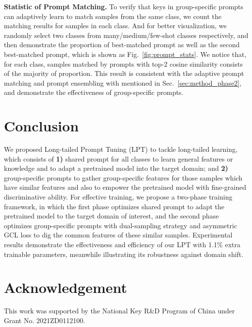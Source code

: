 \documentclass{article} \usepackage{iclr2023_conference,times}
\begin{document}
\textbf{Statistic of Prompt Matching. }
To verify that keys in group-specific prompts can adaptively learn to match samples from the same class, we count the matching results for samples in each class. And for better visualization, we randomly select two classes from many/medium/few-shot classes respectively, and then demonstrate the proportion of best-matched prompt as well as the second best-matched prompt, which is shown as Fig.~\ref{fig:prompt_stats}.
We notice that, for each class, samples matched by prompts with top-2 cosine similarity consists of the majority of proportion. This result is consistent with the adaptive prompt matching and prompt ensembling with  mentioned in Sec.~\ref{sec:method_phase2}, and demonstrate the effectiveness of group-specific prompts. 

\vspace{-0.5em}
\section{Conclusion}\label{sec:conclusion}
\vspace{-0.5em}
We proposed Long-tailed Prompt Tuning (LPT) to tackle long-tailed learning, 
which consists of \textbf{1)} shared prompt for all classes to learn general features or knowledge and to adapt a pretrained model into the target domain; and \textbf{2)} group-specific prompts to gather group-specific features for those samples which have similar features and also to empower the pretrained model with fine-grained discriminative ability.
For effective training, we propose a two-phase training framework, in which the first phase optimizes shared prompt to adapt the pretrained model to the target domain of interest, and the second phase optimizes group-specific prompts with dual-sampling strategy and asymmetric GCL loss to dig the common features of these similar samples.
Experimental results demonstrate the effectiveness and efficiency of our LPT with 1.1\% extra trainable parameters,
meanwhile illustrating its robustness against domain shift.


\vspace{-0.5em}
\section*{Acknowledgement}\label{sec:acknowledgement}
\vspace{-0.5em}
This work was supported  by the National Key R\&D Program of China under Grant No. 2021ZD0112100.
\end{document}
